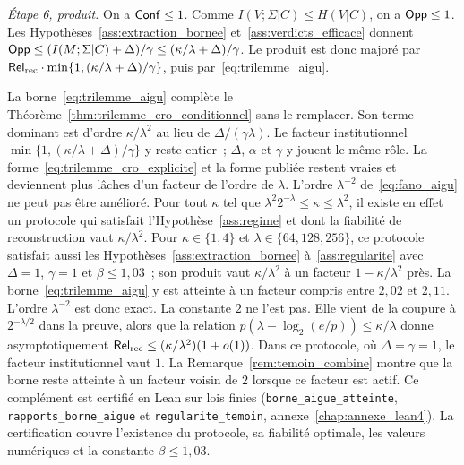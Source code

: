\begin{sloppypar}
\begin{Preuve}
\emph{\'Etape 6, produit.} On a $\mathsf{Conf} \leq 1$. Comme $I(V;\Sigma|C) \leq H(V|C)$, on a
$\mathsf{Opp} \leq 1$. Les Hypoth\`eses~\ref{ass:extraction_bornee} et~\ref{ass:verdicts_efficace}
donnent $\mathsf{Opp} \leq (I(M;\Sigma|C) + \Delta)/\gamma \leq (\kappa/\lambda + \Delta)/\gamma$.
Le produit est donc major\'e par $\mathsf{Rel}_{\mathrm{rec}} \cdot \min\{1, (\kappa/\lambda+\Delta)/\gamma\}$,
puis par~\eqref{eq:trilemme_aigu}.
\end{Preuve}

\begin{remark}
\label{rem:borne_aigue_portee}
La borne~\eqref{eq:trilemme_aigu} compl\`ete le Th\'eor\`eme~\ref{thm:trilemme_cro_conditionnel}
sans le remplacer. Son terme dominant est d'ordre $\kappa/\lambda^2$ au lieu de
$\Delta/(\gamma\lambda)$. Le facteur institutionnel
$\min\{1,(\kappa/\lambda+\Delta)/\gamma\}$ y reste entier~; $\Delta$, $\alpha$
et $\gamma$ y jouent le m\^eme r\^ole. La forme~\eqref{eq:trilemme_cro_explicite} et la
forme publi\'ee restent vraies et deviennent plus l\^aches d'un facteur de l'ordre de
$\lambda$. L'ordre $\lambda^{-2}$ de~\eqref{eq:fano_aigu} ne peut pas \^etre am\'elior\'e.
Pour tout $\kappa$ tel que $\lambda^2 2^{-\lambda} \leq \kappa \leq \lambda^2$, il existe en effet un protocole qui
satisfait l'Hypoth\`ese~\ref{ass:regime} et dont la fiabilit\'e de reconstruction vaut
$\kappa/\lambda^2$. Pour $\kappa \in \{1,4\}$ et $\lambda \in \{64,128,256\}$, ce protocole
satisfait aussi les Hypoth\`eses~\ref{ass:extraction_bornee} \`a~\ref{ass:regularite}
avec $\Delta = 1$, $\gamma = 1$ et $\beta \leq 1{,}03$~; son produit vaut
$\kappa/\lambda^2$ \`a un facteur $1 - \kappa/\lambda^2$ pr\`es. La
borne~\eqref{eq:trilemme_aigu} y est atteinte \`a un facteur compris entre $2{,}02$ et
$2{,}11$. L'ordre $\lambda^{-2}$ est donc exact. La constante $2$ ne l'est pas. Elle vient
de la coupure \`a $2^{-\lambda/2}$ dans la preuve, alors que la relation
$p(\lambda - \log_2(e/p)) \leq \kappa/\lambda$ donne asymptotiquement
$\mathsf{Rel}_{\mathrm{rec}} \leq (\kappa/\lambda^2)(1 + o(1))$. Dans ce protocole, o\`u $\Delta = \gamma = 1$, le facteur institutionnel vaut
$1$. La Remarque~\ref{rem:temoin_combine} montre que la borne
reste atteinte \`a un facteur voisin de $2$ lorsque ce facteur est actif. Ce compl\'ement est
certifi\'e en Lean sur lois finies (\texttt{borne\_aigue\_atteinte}, \texttt{rapports\_borne\_aigue}
et \texttt{regularite\_temoin}, annexe~\ref{chap:annexe_lean4}). La certification couvre l'existence
du protocole, sa fiabilit\'e optimale, les valeurs num\'eriques et la constante $\beta \leq 1{,}03$.
\end{remark}


\end{sloppypar}
